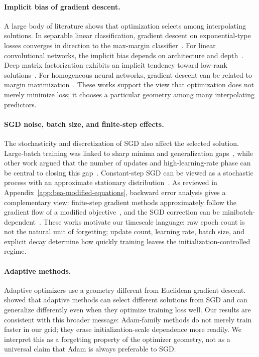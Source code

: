 \documentclass{article}
\begin{document}
\paragraph{Implicit bias of gradient descent.}
A large body of literature shows that optimization selects among interpolating solutions.  In separable linear classification, gradient descent on exponential-type losses converges in direction to the max-margin classifier~\citep{soudry2018implicit}.  For linear convolutional networks, the implicit bias depends on architecture and depth~\citep{gunasekar2018implicit}.  Deep matrix factorization exhibits an implicit tendency toward low-rank solutions~\citep{arora2019implicit}.  For homogeneous neural networks, gradient descent can be related to margin maximization~\citep{lyu2020gradient}.  These works support the view that optimization does not merely minimize loss; it chooses a particular geometry among many interpolating predictors.

\paragraph{SGD noise, batch size, and finite-step effects.}
The stochasticity and discretization of SGD also affect the selected solution.  Large-batch training was linked to sharp minima and generalization gaps~\citep{keskar2017large}, while other work argued that the number of updates and high-learning-rate phase can be central to closing this gap~\citep{hoffer2017train}.  Constant-step SGD can be viewed as a stochastic process with an approximate stationary distribution~\citep{mandt2017sgd}.  As reviewed in Appendix~\ref{app:bea-modified-equations}, backward error analysis gives a complementary view: finite-step gradient methods approximately follow the gradient flow of a modified objective~\citep{barrett2021implicit}, and the SGD correction can be minibatch-dependent~\citep{smith2021origin}.  These works motivate our timescale language: raw epoch count is not the natural unit of forgetting; update count, learning rate, batch size, and explicit decay determine how quickly training leaves the initialization-controlled regime.

\paragraph{Adaptive methods.}
Adaptive optimizers use a geometry different from Euclidean gradient descent.  \citep{wilson2017marginal} showed that adaptive methods can select different solutions from SGD and can generalize differently even when they optimize training loss well.  Our results are consistent with this broader message: Adam-family methods do not merely train faster in our grid; they erase initialization-scale dependence more readily.  We interpret this as a forgetting property of the optimizer geometry, not as a universal claim that Adam is always preferable to SGD.
\end{document}
